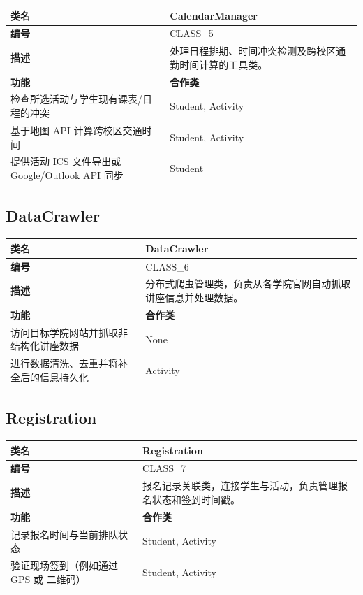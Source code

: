 \documentclass[UTF8,a4paper,12pt,fontset=none]{ctexrep}
\begin{document}
\begingroup
\small
\begin{longtable}{|>{\raggedright\arraybackslash}p{}|>{\raggedright\arraybackslash}p{}|}
\hline
\textbf{类名} & \textbf{CalendarManager} \\
\hline
\textbf{编号} & CLASS\_5 \\
\hline
\textbf{描述} & 处理日程排期、时间冲突检测及跨校区通勤时间计算的工具类。 \\
\hline
\textbf{功能} & \textbf{合作类} \\
\hline
检查所选活动与学生现有课表/日程的冲突 & Student, Activity \\
\hline
基于地图 API 计算跨校区交通时间 & Student, Activity \\
\hline
提供活动 ICS 文件导出或 Google/Outlook API 同步 & Student \\
\hline
\end{longtable}
\endgroup

\subsection{DataCrawler}

\begingroup
\small
\begin{longtable}{|>{\raggedright\arraybackslash}p{}|>{\raggedright\arraybackslash}p{}|}
\hline
\textbf{类名} & \textbf{DataCrawler} \\
\hline
\textbf{编号} & CLASS\_6 \\
\hline
\textbf{描述} & 分布式爬虫管理类，负责从各学院官网自动抓取讲座信息并处理数据。 \\
\hline
\textbf{功能} & \textbf{合作类} \\
\hline
访问目标学院网站并抓取非结构化讲座数据 & None \\
\hline
进行数据清洗、去重并将补全后的信息持久化 & Activity \\
\hline
\end{longtable}
\endgroup

\subsection{Registration}

\begingroup
\small
\begin{longtable}{|>{\raggedright\arraybackslash}p{}|>{\raggedright\arraybackslash}p{}|}
\hline
\textbf{类名} & \textbf{Registration} \\
\hline
\textbf{编号} & CLASS\_7 \\
\hline
\textbf{描述} & 报名记录关联类，连接学生与活动，负责管理报名状态和签到时间戳。 \\
\hline
\textbf{功能} & \textbf{合作类} \\
\hline
记录报名时间与当前排队状态 & Student, Activity \\
\hline
验证现场签到（例如通过 GPS 或 二维码） & Student, Activity \\
\hline
\end{longtable}
\endgroup
\end{document}
